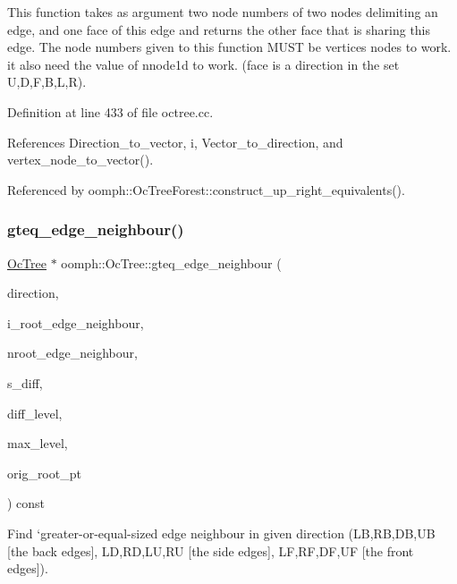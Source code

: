 This function takes as argument two node numbers of two nodes delimiting an edge, and one face of this edge and returns the other face that is sharing this edge. The node numbers given to this function M\+U\+ST be vertices nodes to work. it also need the value of nnode1d to work. ({\ttfamily face} is a direction in the set U,D,F,B,L,R). 

Definition at line 433 of file octree.\+cc.



References Direction\+\_\+to\+\_\+vector, i, Vector\+\_\+to\+\_\+direction, and vertex\+\_\+node\+\_\+to\+\_\+vector().



Referenced by oomph\+::\+Oc\+Tree\+Forest\+::construct\+\_\+up\+\_\+right\+\_\+equivalents().

\mbox{\label{classoomph_1_1OcTree_abaa4c8bbf2fdbad7465af2c4964a915f}} 
\subsubsection{\texorpdfstring{gteq\+\_\+edge\+\_\+neighbour()}{gteq\_edge\_neighbour()}}
{\footnotesize\ttfamily \hyperlink{classoomph_1_1OcTree}{Oc\+Tree} $\ast$ oomph\+::\+Oc\+Tree\+::gteq\+\_\+edge\+\_\+neighbour (\begin{DoxyParamCaption}\item[{const int \&}]{direction,  }\item[{const unsigned \&}]{i\+\_\+root\+\_\+edge\+\_\+neighbour,  }\item[{unsigned \&}]{nroot\+\_\+edge\+\_\+neighbour,  }\item[{double \&}]{s\+\_\+diff,  }\item[{int \&}]{diff\+\_\+level,  }\item[{int}]{max\+\_\+level,  }\item[{\hyperlink{classoomph_1_1OcTreeRoot}{Oc\+Tree\+Root} $\ast$}]{orig\+\_\+root\+\_\+pt }\end{DoxyParamCaption}) const\hspace{0.3cm}{\ttfamily [private]}}



Find `greater-\/or-\/equal-\/sized edge neighbour\textquotesingle{} in given direction (LB,RB,DB,UB \mbox{[}the back edges\mbox{]}, LD,RD,LU,RU \mbox{[}the side edges\mbox{]}, LF,RF,DF,UF \mbox{[}the front edges\mbox{]}). 

